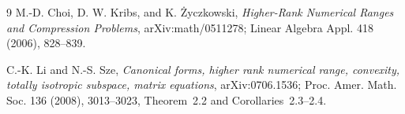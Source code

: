 \documentclass[11pt]{article}
\begin{document}
\begin{thebibliography}{9}
M.-D. Choi, D. W. Kribs, and K. Życzkowski,
\emph{Higher-Rank Numerical Ranges and Compression Problems},
arXiv:math/0511278; Linear Algebra Appl. 418 (2006), 828--839.

C.-K. Li and N.-S. Sze,
\emph{Canonical forms, higher rank numerical range, convexity, totally
isotropic subspace, matrix equations},
arXiv:0706.1536; Proc. Amer. Math. Soc. 136 (2008), 3013--3023,
Theorem~2.2 and Corollaries~2.3--2.4.
\end{thebibliography}
\end{document}
